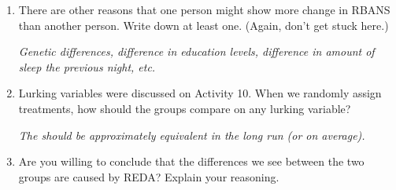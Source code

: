 \begin{enumerate}
\begin{enumerate}
 \item  Below the plot, keep    and  enter the
   {\bf observed difference in means from the original data} in the
   last box.  Click . What proportion of the samples are this
   extreme?   
\begin{students}
    \vspace{2cm}    
\end{students}

\begin{key}
  {\it 0.008 in my sample. }
\end{key}

   \end{enumerate}

 \item  There are other reasons that one person might show more change
   in RBANS than another person.  Write down at least one. (Again,
   don't get stuck here.) 
\begin{students}
    \vspace{2cm}    
\end{students}

\begin{key}
  {\it   Genetic differences, difference in education levels, difference
     in amount of sleep the previous night, etc. 
}
\end{key}
\vspace{6cm}

 \item  Lurking variables were discussed on Activity 10.  When we
   randomly assign treatments, how should the groups compare on any
   lurking variable? 
\begin{students}
    \vspace{3cm}    
\end{students}

\begin{key}
  {\it  The should be approximately equivalent in the long run (or on average). }
\end{key}
   
 \item  Are you willing to conclude that the differences we see
   between the two groups are caused by REDA?  Explain
   your reasoning. 
\begin{students}
    \vspace{4cm}    
\end{students}


\end{enumerate}
